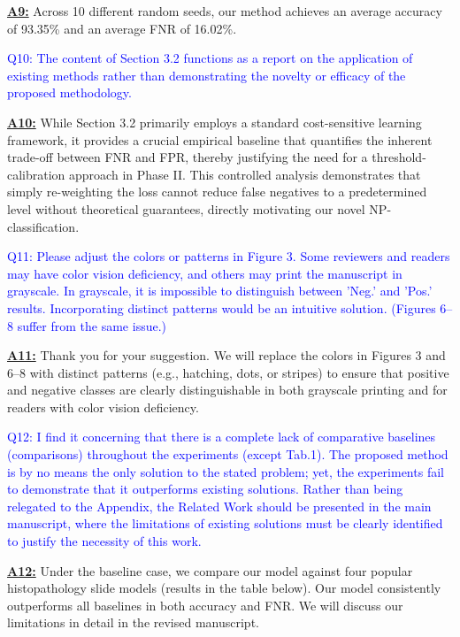 \documentclass[UTF8,12pt]{article}
\begin{document}
\underline{{\bf A9:}} Across 10 different random seeds, our method achieves an average accuracy of 93.35\% and an average FNR of 16.02\%.

\textcolor{blue}{Q10: The content of Section 3.2 functions as a report on the application of existing methods rather than demonstrating the novelty or efficacy of the proposed methodology.}

\underline{{\bf A10:}} While Section 3.2 primarily employs a standard cost-sensitive learning framework, it provides a crucial empirical baseline that quantifies the inherent trade-off between FNR and FPR, thereby justifying the need for a threshold-calibration approach in Phase II. This controlled analysis demonstrates that simply re-weighting the loss cannot reduce false negatives to a predetermined level without theoretical guarantees, directly motivating our novel NP-classification.

\textcolor{blue}{Q11: Please adjust the colors or patterns in Figure 3. Some reviewers and readers may have color vision deficiency, and others may print the manuscript in grayscale. In grayscale, it is impossible to distinguish between 'Neg.' and 'Pos.' results. Incorporating distinct patterns would be an intuitive solution. (Figures 6–8 suffer from the same issue.)}

\underline{{\bf A11:}} Thank you for your suggestion. We will replace the colors in Figures 3 and 6–8 with distinct patterns (e.g., hatching, dots, or stripes) to ensure that positive and negative classes are clearly distinguishable in both grayscale printing and for readers with color vision deficiency.

\textcolor{blue}{Q12: I find it concerning that there is a complete lack of comparative baselines (comparisons) throughout the experiments (except Tab.1). The proposed method is by no means the only solution to the stated problem; yet, the experiments fail to demonstrate that it outperforms existing solutions. Rather than being relegated to the Appendix, the Related Work should be presented in the main manuscript, where the limitations of existing solutions must be clearly identified to justify the necessity of this work.}

\underline{{\bf A12:}} Under the baseline case, we compare our model against four popular histopathology slide models (results in the table below). Our model consistently outperforms all baselines in both accuracy and FNR. We will discuss our limitations in detail in the revised manuscript.
\end{document}
